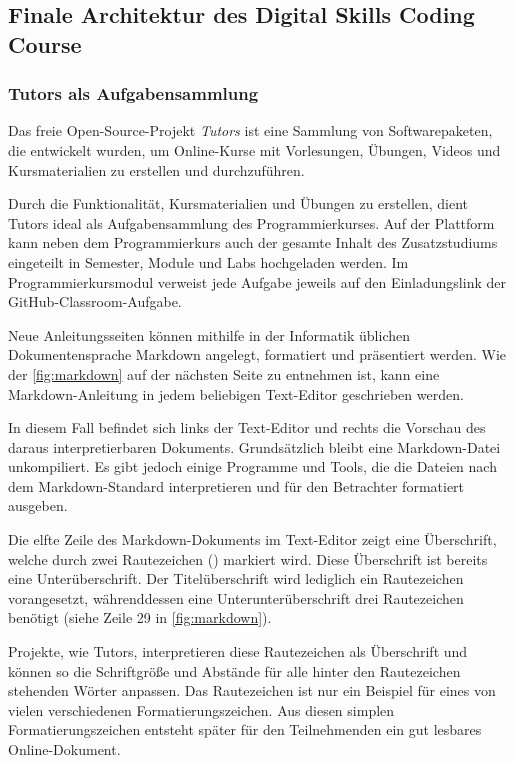 \subsection{Finale Architektur des Digital Skills Coding Course}
\subsubsection{Tutors als Aufgabensammlung}\label{finale-architektur-tutors}
Das freie Open-Source-Projekt \emph{Tutors} ist eine Sammlung von
Softwarepaketen, die entwickelt wurden, um Online-Kurse mit Vorlesungen,
Übungen, Videos und Kursmaterialien zu erstellen und durchzuführen.
\parencite{tutors}

Durch die Funktionalität, Kursmaterialien und Übungen zu erstellen, dient Tutors
ideal als Aufgabensammlung des Programmierkurses. Auf der Plattform kann neben
dem Programmierkurs auch der gesamte Inhalt des Zusatzstudiums eingeteilt in
Semester, Module und Labs hochgeladen werden. Im Programmierkursmodul verweist
jede Aufgabe jeweils auf den Einladungslink der GitHub-Classroom-Aufgabe.

Neue Anleitungsseiten können mithilfe in der Informatik üblichen
Dokumentensprache Markdown angelegt, formatiert und präsentiert werden. Wie der
\autoref{fig:markdown} auf der nächsten Seite zu entnehmen ist, kann eine 
Markdown-Anleitung in jedem beliebigen Text-Editor geschrieben werden.

In diesem Fall befindet sich links der Text-Editor und rechts die Vorschau des
daraus interpretierbaren Dokuments. Grundsätzlich bleibt eine Markdown-Datei
unkompiliert. Es gibt jedoch einige Programme und Tools, die die Dateien
nach dem Markdown-Standard interpretieren und für den Betrachter formatiert
ausgeben.

Die elfte Zeile des Markdown-Dokuments im Text-Editor zeigt eine Überschrift,
welche durch zwei Rautezeichen (\code{\#\#}) markiert wird. Diese Überschrift
ist bereits eine Unterüberschrift. Der Titelüberschrift wird lediglich ein
Rautezeichen vorangesetzt, währenddessen eine Unterunterüberschrift drei
Rautezeichen benötigt (siehe Zeile 29 in \autoref{fig:markdown}).

Projekte, wie Tutors, interpretieren diese Rautezeichen als Überschrift und
können so die Schriftgröße und Abstände für alle hinter den Rautezeichen
stehenden Wörter anpassen. Das Rautezeichen ist nur ein Beispiel für eines von
vielen verschiedenen Formatierungszeichen. Aus diesen simplen
Formatierungszeichen entsteht später für den Teilnehmenden ein gut lesbares
Online-Dokument. \parencite{markdown}

